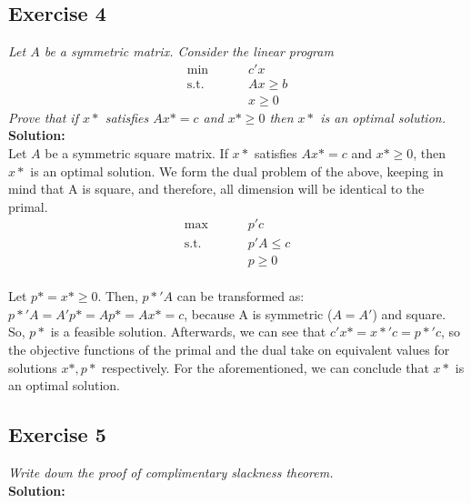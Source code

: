 \documentclass[12pt]{article}
\begin{document}
\subsection*{Exercise 4}
\textit{Let $A$ be a symmetric matrix. Consider the linear program}
\\
\begin{align*}
\text{min } \qquad & c'x \\
\text{s.t. } \qquad  & Ax \geqslant b \\
							& x \geqslant 0
\end{align*}
\textit{Prove that if $x*$ satisfies $A x* = c$ and $x* \geqslant 0$ then $x*$ is an optimal solution.}
\textbf{Solution:} \\  
Let $A$ be a symmetric square matrix. If $x*$ satisfies $Ax* = c$ and $x* \geqslant 0$, then $x*$ is an optimal solution. We form the dual problem of the above, keeping in mind that A is square, and therefore, all dimension will be identical to the primal.
\begin{align*}
\text{max } \qquad & p' c \\
\text{s.t. } \qquad  & p'A \leqslant c \\
							& p \geqslant 0
\end{align*} \\
Let $p* = x* \geqslant 0$. Then, $p *' A$ can be transformed as: $p *' A = A'p* = Ap* = Ax* = c$, because A is symmetric ($A = A'$) and square. So, $p*$ is a feasible solution. Afterwards, we can see that $c'x* = x*'c = p*'c$, so the objective functions of the primal and the dual take on equivalent values for solutions $x*, p*$ respectively. For the aforementioned, we can conclude that $x*$ is an optimal solution.
\newpage

\subsection*{Exercise 5}
\textit{Write down the proof of complimentary slackness theorem. }
\\ 
\textbf{Solution:} \\  

\newpage
  	
\end{document}
